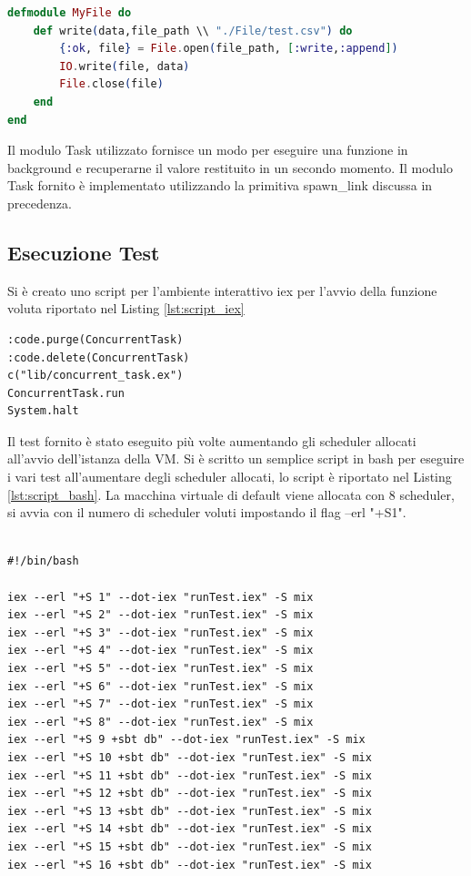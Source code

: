 \begin{lstlisting}[language=elixir, caption={Modulo MyFile},
	captionpos=b,label={lst:MyFile}]
defmodule MyFile do
	def write(data,file_path \\ "./File/test.csv") do
		{:ok, file} = File.open(file_path, [:write,:append])
		IO.write(file, data)
    	File.close(file)
	end 
end
\end{lstlisting}

Il modulo Task utilizzato fornisce un modo per eseguire
una funzione in background e recuperarne il valore
restituito in un secondo momento.
Il modulo Task fornito è
implementato utilizzando la primitiva spawn\_link discussa
in precedenza.


\subsection{Esecuzione Test}

Si è creato uno script per l'ambiente interattivo iex per l'avvio
della funzione voluta riportato nel Listing \ref{lst:script_iex}

\begin{lstlisting}[language=none,captionpos=b,
	caption={Script iex per l'avvio dei test},
	label={lst:script_iex}]
:code.purge(ConcurrentTask)
:code.delete(ConcurrentTask)
c("lib/concurrent_task.ex")
ConcurrentTask.run
System.halt
\end{lstlisting}
	


Il test fornito è stato eseguito più volte aumentando
gli scheduler allocati all'avvio dell'istanza della VM.
Si è scritto un semplice script in bash per eseguire
i vari test all'aumentare degli scheduler allocati, lo script
è riportato nel Listing \ref{lst:script_bash}.
La macchina virtuale di default viene allocata con 8
scheduler, si avvia con il numero di scheduler voluti
impostando il flag --erl "+S1".

\begin{lstlisting}[language=none,captionpos=b,
	caption={Script bash per l'avvio dei test},
	label={lst:script_bash}]

#!/bin/bash

iex --erl "+S 1" --dot-iex "runTest.iex" -S mix
iex --erl "+S 2" --dot-iex "runTest.iex" -S mix
iex --erl "+S 3" --dot-iex "runTest.iex" -S mix
iex --erl "+S 4" --dot-iex "runTest.iex" -S mix
iex --erl "+S 5" --dot-iex "runTest.iex" -S mix
iex --erl "+S 6" --dot-iex "runTest.iex" -S mix
iex --erl "+S 7" --dot-iex "runTest.iex" -S mix
iex --erl "+S 8" --dot-iex "runTest.iex" -S mix
iex --erl "+S 9 +sbt db" --dot-iex "runTest.iex" -S mix
iex --erl "+S 10 +sbt db" --dot-iex "runTest.iex" -S mix
iex --erl "+S 11 +sbt db" --dot-iex "runTest.iex" -S mix
iex --erl "+S 12 +sbt db" --dot-iex "runTest.iex" -S mix
iex --erl "+S 13 +sbt db" --dot-iex "runTest.iex" -S mix
iex --erl "+S 14 +sbt db" --dot-iex "runTest.iex" -S mix
iex --erl "+S 15 +sbt db" --dot-iex "runTest.iex" -S mix
iex --erl "+S 16 +sbt db" --dot-iex "runTest.iex" -S mix
	
\end{lstlisting}

